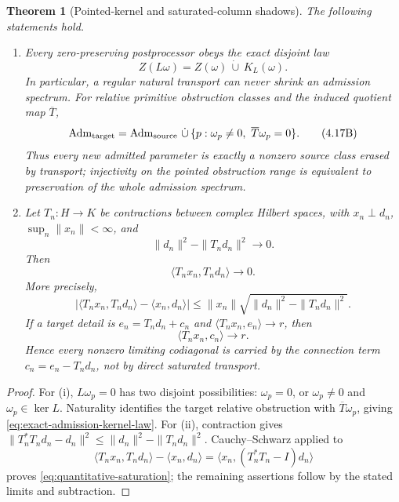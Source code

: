 \documentclass[11pt]{article}
\newtheorem{theorem}{Theorem}[section]
\theoremstyle{definition}
\theoremstyle{remark}
\begin{document}
\begin{theorem}[Pointed-kernel and saturated-column shadows]
\label{thm:covariant-selection}
The following statements hold.

\begin{enumerate}[label=(\roman*)]
\item Every zero-preserving postprocessor obeys the exact disjoint law
      \[
             Z(L\omega)=Z(\omega)\,\dot\cup\,K_L(\omega).
      \tag{4.17A}\label{eq:exact-kernel-zero-law}
      \]
      In particular, a regular natural transport can never shrink an
      admission spectrum.  For relative primitive obstruction classes and
      the induced quotient map \(\overline T\),
      \[
       \operatorname{Adm}_{\rm target}
       =\operatorname{Adm}_{\rm source}\,\dot\cup\,
       \{p:\omega_p\ne0,\ \overline T\omega_p=0\}.
      \tag{4.17B}\label{eq:exact-admission-kernel-law}
      \]
      Thus every new admitted parameter is exactly a nonzero source class
      erased by transport; injectivity on the pointed obstruction range is
      equivalent to preservation of the whole admission spectrum.
\item Let \(T_n:H\to K\) be contractions between complex Hilbert spaces,
      with \(x_n\perp d_n\), \(\sup_n\|x_n\|<\infty\), and
      \[
                \|d_n\|^2-\|T_nd_n\|^2\longrightarrow0.
      \]
      Then
      \[
                    \langle T_nx_n,T_nd_n\rangle\longrightarrow0.
      \tag{4.17C}\label{eq:saturated-codiagonal-conservation}
      \]
      More precisely,
      \[
       \left|\langle T_nx_n,T_nd_n\rangle-
                    \langle x_n,d_n\rangle\right|
       \le \|x_n\|
          \sqrt{\|d_n\|^2-\|T_nd_n\|^2}.
      \tag{4.17D}\label{eq:quantitative-saturation}
      \]
      If a target detail is
      \(e_n=T_nd_n+c_n\) and
      \(\langle T_nx_n,e_n\rangle\to r\), then
      \[
                    \langle T_nx_n,c_n\rangle\longrightarrow r.
      \tag{4.17E}\label{eq:connection-carries-column}
      \]
      Hence every nonzero limiting codiagonal is carried by the connection
      term \(c_n=e_n-T_nd_n\), not by direct saturated transport.
\end{enumerate}
\end{theorem}

\begin{proof}
For (i), \(L\omega_p=0\) has two disjoint possibilities:
\(\omega_p=0\), or \(\omega_p\ne0\) and \(\omega_p\in\ker L\).
Naturality identifies the target relative obstruction with
\(\overline T\omega_p\), giving \eqref{eq:exact-admission-kernel-law}.
For (ii), contraction gives
\(\|T_n^*T_nd_n-d_n\|^2\le
\|d_n\|^2-\|T_nd_n\|^2\).  Cauchy--Schwarz applied to
\[
 \langle T_nx_n,T_nd_n\rangle-\langle x_n,d_n\rangle
 =\langle x_n,(T_n^*T_n-I)d_n\rangle
\]
proves \eqref{eq:quantitative-saturation}; the remaining assertions follow
by the stated limits and subtraction.
\end{proof}
\end{document}
